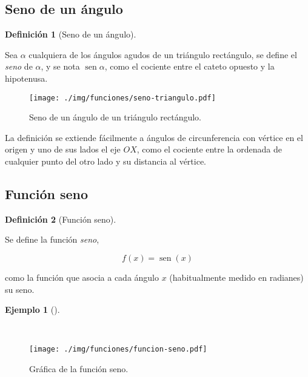 \documentclass[
  a4paper,
]{scrreport}
\theoremstyle{plain}
\theoremstyle{definition}
\theoremstyle{plain}
\theoremstyle{plain}
\theoremstyle{definition}
\newtheorem{example}{Ejemplo}[chapter]
\theoremstyle{definition}
\newtheorem{definition}{Definición}[chapter]
\theoremstyle{remark}
\begin{document}
\subsection{Seno de un ángulo}\label{seno-de-un-uxe1ngulo}

\begin{definition}[Seno de un
ángulo]\protect\hypertarget{def-seno-angulo}{}\label{def-seno-angulo}

Sea \(\alpha\) cualquiera de los ángulos agudos de un triángulo
rectángulo, se define el \emph{seno} de \(\alpha\), y se nota
\(\operatorname{sen} \alpha\), como el cociente entre el cateto opuesto
y la hipotenusa.

\end{definition}

\begin{figure}[H]

{\centering \texttt{[image: ./img/funciones/seno-triangulo.pdf]}

}

\caption{Seno de un ángulo de un triángulo rectángulo.}

\end{figure}%

La definición se extiende fácilmente a ángulos de circunferencia con
vértice en el origen y uno de sus lados el eje \(OX\), como el cociente
entre la ordenada de cualquier punto del otro lado y su distancia al
vértice.

\subsection{Función seno}\label{funciuxf3n-seno}

\begin{definition}[Función
seno]\protect\hypertarget{def-funcion-seno}{}\label{def-funcion-seno}

Se define la función \emph{seno},

\[f(x)=\operatorname{sen}(x)\]

como la función que asocia a cada ángulo \(x\) (habitualmente medido en
radianes) su seno.

\end{definition}

\begin{example}[]\protect\hypertarget{exm-funcion-seno}{}\label{exm-funcion-seno}

~

\begin{figure}[H]

{\centering \texttt{[image: ./img/funciones/funcion-seno.pdf]}

}

\caption{Gráfica de la función seno.}

\end{figure}%

\end{example}
\end{document}
